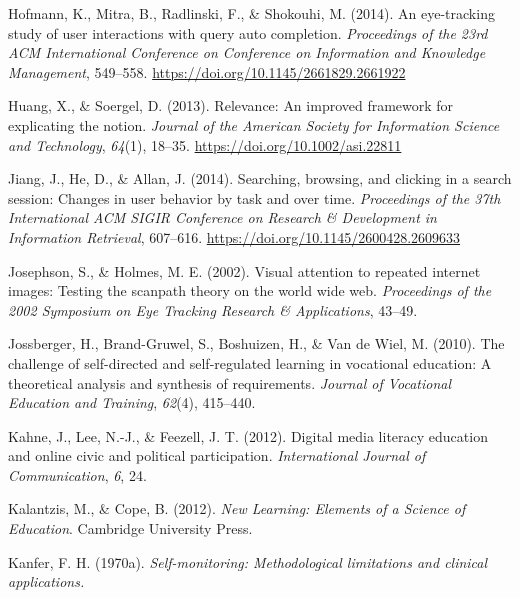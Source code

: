 \documentclass[letterpaper, nobind]{templates/ociamthesis}
\newlength{\cslhangindent}
\newenvironment{CSLReferences}[2] %
 {%
  \setlength{\parindent}{0pt}
  \ifodd #1
  \let\oldpar\par
  \def\par{\hangindent=\cslhangindent\oldpar}
  \fi
  \setlength{\parskip}{1mm}
  \setlength{\baselineskip}{6mm}
 }%
 {}
\begin{document}
\begin{CSLReferences}{1}{0}
\leavevmode{}%
Hofmann, K., Mitra, B., Radlinski, F., \& Shokouhi, M. (2014). An eye-tracking study of user interactions with query auto completion. \emph{Proceedings of the 23rd {ACM} International Conference on Conference on Information and Knowledge Management}, 549--558. \url{https://doi.org/10.1145/2661829.2661922}

\leavevmode{}%
Huang, X., \& Soergel, D. (2013). Relevance: {An} improved framework for explicating the notion. \emph{Journal of the American Society for Information Science and Technology}, \emph{64}(1), 18--35. \url{https://doi.org/10.1002/asi.22811}

\leavevmode{}%
Jiang, J., He, D., \& Allan, J. (2014). Searching, browsing, and clicking in a search session: {Changes} in user behavior by task and over time. \emph{Proceedings of the 37th International {ACM SIGIR} Conference on Research \& Development in Information Retrieval}, 607--616. \url{https://doi.org/10.1145/2600428.2609633}

\leavevmode{}%
Josephson, S., \& Holmes, M. E. (2002). Visual attention to repeated internet images: Testing the scanpath theory on the world wide web. \emph{Proceedings of the 2002 Symposium on Eye Tracking Research \& Applications}, 43--49.

\leavevmode{}%
Jossberger, H., Brand-Gruwel, S., Boshuizen, H., \& Van de Wiel, M. (2010). The challenge of self-directed and self-regulated learning in vocational education: A theoretical analysis and synthesis of requirements. \emph{Journal of Vocational Education and Training}, \emph{62}(4), 415--440.

\leavevmode{}%
Kahne, J., Lee, N.-J., \& Feezell, J. T. (2012). Digital media literacy education and online civic and political participation. \emph{International Journal of Communication}, \emph{6}, 24.

\leavevmode{}%
Kalantzis, M., \& Cope, B. (2012). \emph{New {Learning}: Elements of a {Science} of {Education}}. {Cambridge University Press}.

\leavevmode{}%
Kanfer, F. H. (1970a). \emph{Self-monitoring: Methodological limitations and clinical applications.}


\end{CSLReferences}
\end{document}
